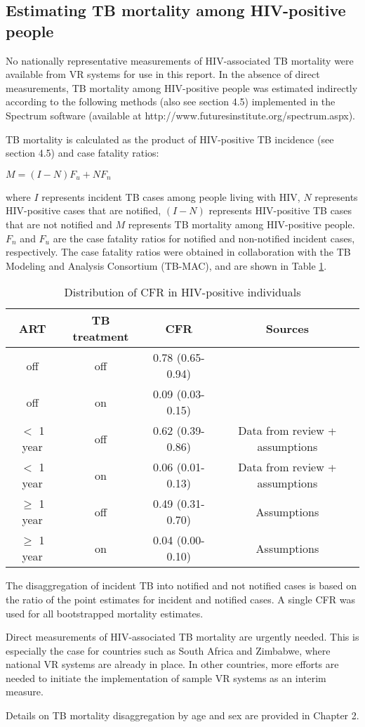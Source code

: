 \subsection{Estimating TB mortality among HIV-positive people}

No nationally representative measurements of HIV-associated TB mortality were available from VR systems for use in this report. In the absence of direct measurements, TB mortality among HIV-positive people was estimated indirectly according to the following methods (also see section 4.5) implemented in the Spectrum software (available at http://www.futuresinstitute.org/spectrum.aspx).

TB mortality is calculated as the product of HIV-positive TB incidence (see section 4.5) and case fatality ratios:

$M = (I-N)F_u + NF_n$ 									

where $I$ represents incident TB cases among people living with HIV, $N$ represents HIV-positive cases that are notified, $(I-N)$ represents HIV-positive TB cases that are not notified and $M$ represents TB mortality among HIV-positive people. $F_n$ and $F_u$ are the case fatality ratios for notified and non-notified incident cases, respectively. The case fatality ratios were obtained in collaboration with the TB Modeling and Analysis Consortium (TB-MAC), and are shown in Table \ref{tab:hivcfr}.

\begin{table} 
\label{tab:hivcfr}
    \begin{tabular}{ c c c c }
    \hline
        ART  & TB treatment & CFR & Sources \\ 
        \hline
        off            & off  & 0.78 (0.65-0.94) &  \cite{12742798} \\ 
        off            & on   & 0.09 (0.03-0.15) & \cite{21738585} \cite{11216921}\\ 
        $<$ 1 year     & off  & 0.62 (0.39-0.86) & Data from review + assumptions \\ 
        $<$ 1 year     & on   & 0.06 (0.01-0.13) & Data from review + assumptions \\ 
        $\geq$ 1 year  & off  & 0.49 (0.31-0.70) & Assumptions \\ 
        $\geq$ 1 year  & on   & 0.04 (0.00-0.10) & Assumptions \\ 
        \hline
    \end{tabular} 
    \caption{Distribution of CFR in HIV-positive individuals}
\end{table}

The disaggregation of incident TB into notified and not notified cases is based on the ratio of the point estimates for incident and notified cases. A single CFR was used for all bootstrapped mortality estimates.

Direct measurements of HIV-associated TB mortality are urgently needed. This is especially the case for countries such as South Africa and Zimbabwe, where national VR systems are already in place. In other countries, more efforts are needed to initiate the implementation of sample VR systems as an interim measure.

Details on TB mortality disaggregation by age and sex are provided in Chapter 2.
